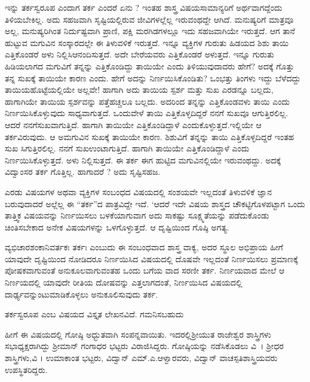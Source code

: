 {ಇನ್ನು ತರ್ಕ\enginline{-}ಸ್ವರೂಪ ಎಂದಾಗ ತರ್ಕ ಎಂದರೆ ಏನು ? ಇಂತಹ ಶಾಸ್ತ್ರ ವಿಷಯ\break ಸಾಮಾನ್ಯರಿಗೆ ಅರ್ಥವಾಗದ್ದೆಂದು ತಿಳಿಯಬೇಕಿಲ್ಲ. ಅದು ಸಹಜವಾಗಿ ಸೃಷ್ಟಿಯಲ್ಲಿರುವ ಜೀವಿಗಳಲ್ಲೆಲ್ಲ ಇರುವಂಥದ್ದೇ ಆಗಿದೆ. ಮನುಷ್ಯರಿಗೆ ಮಾತ್ರವೂ ಅಲ್ಲ, ಮನುಷ್ಯರಿ\-ಗಿಂತ ನಿರ್ದುಷ್ಟವಾಗಿ ಪ್ರಾಣಿ, ಪಕ್ಷಿ ಮರಗಿಡಗಳಲ್ಲೂ ಇದು ಸಹಜವಾಗಿಯೇ ಇರುತ್ತದೆ.  ಆಗ ತಾನೆ ಹುಟ್ಟುವ ಮಗುವಿನ ಸಂಸ್ಕಾರದಲ್ಲೇ ಈ ತಿಳುವಳಿಕೆ ಇರುತ್ತದೆ. ಇನ್ನೂ ವ್ಯಕ್ತಿಗಳ ಗುರುತು ಹಿಡಯದ ಶಿಶು ತಾಯಿ ಎತ್ತಿಕೊಂಡರೆ ಅಳು ನಿಲ್ಲಿಸಿ\break ಆನಂದಿಸುತ್ತದೆ. ಅದೇ ಬೇರೆಯವರು ಎತ್ತಿಕೊಂಡರೆ ಅಳುತ್ತದೆ. ಇನ್ನೂ ಗುರುತು ಹಿಡಿಯ\-ಲಾಗದ ಮಗು\-ವಿಗೆ ತನ್ನನ್ನು ಎತ್ತಿಕೊಂಡಿದ್ದು ತಾಯಿಯೇ ಎಂದು ತಿಳಿಯುವುದಾದರು ಹೇಗೆ? ಅದಕ್ಕೆ ಗೊತ್ತು ತನ್ನ ಸುಖಕ್ಕೆ ತಾಯಿಯೇ ಕಾರಣ ಎಂದು. ಹೇಗೆ ಅದನ್ನು ನಿರ್ಣಯಿಸಿ\-ಕೊಂಡಿತು? ಒಂಭತ್ತು ತಿಂಗಳು ಇದ್ದು ಬೆಳೆದದ್ದು ತಾಯಿಯ\break ಹೊಟ್ಟೆಯಲ್ಲಿಯೇ ಅಲ್ಲವೇ! ಹಾಗಾಗಿ ಅದು ತಾಯಿಯ ಸ್ಪರ್ಶ ಮತ್ತು ಸುಖ ಎರಡನ್ನೂ ಬಲ್ಲದು, ಹಾಗಾಗಿಯೇ ತಾಯಿಯ ಸ್ಪರ್ಶವನ್ನು ಪತ್ತೆಹಚ್ಚಲೂ ಬಲ್ಲದು. ಅದರಿಂದ ತನ್ನನ್ನು ಎತ್ತಿಕೊಂಡವಳು ತಾಯಿ ಎಂದು ನಿರ್ಣಯಿಸಿಕೊಳ್ಳುವುದು ಸಾಧ್ಯವಾಗುತ್ತದೆ. ಒಂದುವೇಳೆ ತಾಯಿ ಎತ್ತಿಕೊಳ್ಳದಿದ್ದರೆ ನನಗೆ ಸುಖವೂ ಆಗುತ್ತಿರಲಿಲ್ಲ. ಆದರೆ ನನಗೆ\break ಸುಖವಾಗುತ್ತಿದೆ. ಹಾಗಾಗಿ ತಾಯಿಯೇ ಎತ್ತಿಕೊಂಡಿದ್ದಾಳೆ ಎಂದುಕೊಳ್ಳುತ್ತದೆ.\break ಇಲ್ಲಿಯೇ ಆ ತರ್ಕವಿರುವುದು. ಆ ಅಮಗುವಿನ ಸುಖಕ್ಕೆ ತಾಯಿಯೇ ಕಾರಣ. ಶಿಶುವಿಗೆ ತನ್ನನ್ನು ತಾಯಿ ಎತ್ತಿಕೊಳ್ಳದಿದ್ದರೆ ಇಂತಹ ಸುಖ ಸಿಗುತ್ತಿರಲಿಲ್ಲ. ನನಗೆ ಸುಖ\break ಉಂಟಾಗುತ್ತಿದೆ. ಹಾಗಾಗಿ ತಾಯಿಯೇ ಎತ್ತಿಕೊಂಡಿದ್ದಾಳೆ ಎಂದು ನಿರ್ಣಯಿಸಿಕೊಳ್ಳುತ್ತದೆ. ಅಳು ನಿಲ್ಲಿಸುತ್ತದೆ. ಈ ತರ್ಕ ಈಗ ಹುಟ್ಟಿದ ಮಗುವಿನಲ್ಲಿಯೇ ಇರುವಂಥದ್ದು. ಅದಕ್ಕೆ ವಿದ್ವಾಂಸರ ತರ್ಕ ಗೊತ್ತಿಲ್ಲ. ಹಾಗಾದರೆ ? ಅದು ಸೃಷ್ಟಿಸಹಜ. 

ಎರಡು ವಿಷಯಗಳ ಅಥವಾ ವ್ಯಕ್ತಿಗಳ ಸಂಬಂಧದ ವಿಷಯದಲ್ಲಿ ಸಂಶಯವೇ ಇಲ್ಲದಂತೆ ತಿಳುವಳಿಕೆ \enginline{-} ಜ್ಞಾನ ಬರುವುದಾದರೆ ಅಲ್ಲೆಲ್ಲ ಈ “ತರ್ಕ”ದ ಪಾತ್ರವಿದ್ದೇ ಇದೆ. ‘ಆದರೆ ಇದೇ ವಿಷಯ ಶಾಸ್ತ್ರದ ಚೌಕಟ್ಟಿಗೊಳಪಟ್ಟಾಗ ಒಂದು ತಾತ್ತ್ವಿಕ ವಿಷಯವನ್ನು ನಿರ್ಣಯಿಸಲು ಬಳಕೆಯಾಗುವಾಗ ಅದು ಸಾಕಷ್ಟು ಸೂಕ್ಷ್ಮತೆಯನ್ನು ಪಡೆದುಕೊಂಡು  ಚಿಂತಿಸಬೇಕಾದ ಅನೇಕ ವಿಷಯಗಳನ್ನು ಒಳಗೊಳ್ಳುತ್ತದೆ. ಆ ದೃಷ್ಟಿಯಿಂದ ಗೊಷ್ಠಿ ಅಗತ್ಯ. 

ವ್ಯಭಿಚಾರಶಂಕಾನಿವರ್ತಕಃ ತರ್ಕಃ ಎಂಬುದು ಈ ಸಂಬಂಧವಾದ ಶಾಸ್ತ್ರ ವಾಕ್ಯ, ಅದರ ಸ್ಥೂಲ ಅಭಿಪ್ರಾಯ ಹೀಗೆ \enginline{-} ಯಾವುದೇ ದೃಷ್ಟಿಯಿಂದ ನೋಡಿದರೂ ನಿರ್ಣಯಿ\-ಸಿದ ವಿಷಯದಲ್ಲಿ ದೊಷವೇ ಇಲ್ಲದಂತೆ ನಿರ್ಣಯಿಸಲು ಪ್ರಮಾಣಕ್ಕೆ ಪೋಷಕವಾಗುವಂತೆ ಅನುಕೂಲವಾಗುವಂತಹ ಒಂದು ಬಗೆಯ ವಾದ ಸರಣೀ \enginline{-} ತರ್ಕ. ನಿರ್ಣಯವಾದ ಮೇಲೆ ಆ ನಿರ್ಣಯದಲ್ಲಿ ಯಾವುದೇ ರೀತಿಯ ದೋಷವನ್ನು ಎತ್ತಲಾಗದಂತೆ, ನಿರ್ಣಯಿಸಿದ ವಿಷಯದಲ್ಲಿ ದಾರ್ಢ್ಯವನ್ನುಂಟುಮಾಡಿಕೊಳ್ಳಲು ಅನುಕೂಲಿಸುವುದು ತರ್ಕ.

ತರ್ಕಸ್ವರೂಪ ಎಂಬ ವಿಷಯದ ವಿಸ್ತೃತ ಲೇಖನವಿದೆ. ಗಮನಿಸಬಹುದು

ಹೀಗೆ ಈ ವಿಷಯದಲ್ಲಿ ಗೋಷ್ಠಿ ಅಧ್ಭುತವಾಗಿ ಸಂಪನ್ನವಾಯಿತು. ಇದರಲ್ಲಿ\break ಶ್ರೀಯುತ ರಾಜೇಶ್ವರ ಶಾಸ್ತ್ರಿಗಳು ಸಭಾಧ್ಯಕ್ಷರಾಗಿದ್ದು ಶ್ರೀಮಾನ್ ಗಂಗಾಧರ ಭಟ್ಟರು ವಿರಾಜಿಸಿದ್ದರು. ಗೋಷ್ಠಿಯನ್ನು ನಡೆಸಿಕೊಡಲು ವಿ~। ಶ್ರೀಧರ ಶಾಸ್ತ್ರಿಗಳು,\break ವಿ । ಉಮಾಕಾಂತ ಭಟ್ಟರು, ವಿದ್ವಾನ್ ಎಮ್.ಎ.ಆಳ್ವಾರವರು, ವಿದ್ವಾನ್ ವಾಚಸ್ಪತಿ\break ಶಾಸ್ತ್ರಿಯವರು ಉಪಸ್ಥಿತರಿದ್ದರು. 

}
